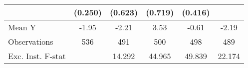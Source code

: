 {\begin{tabular}{l*{5}{c}}
            &     (0.250)         &     (0.623)         &     (0.719)         &     (0.416)         &                     \\
\midrule
Mean Y      &       -1.95         &       -2.21         &        3.53         &       -0.61         &       -2.19         \\
Observations&         536         &         491         &         500         &         498         &         489         \\
Exc. Inst. F-stat&                     &      14.292         &      44.965         &      49.839         &      22.174         \\
\bottomrule
\end{tabular}
}
